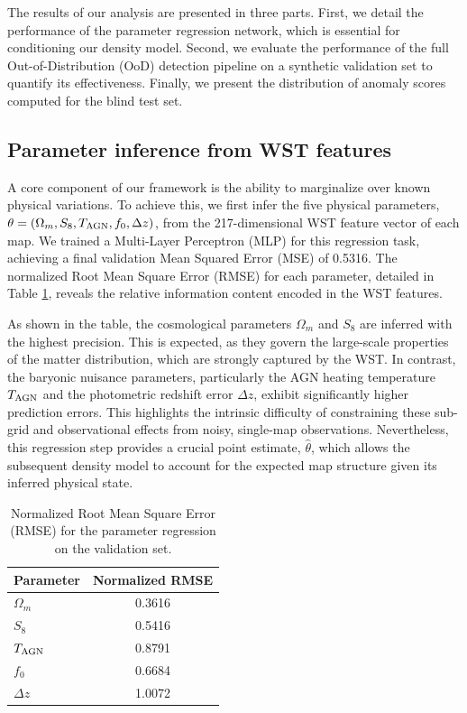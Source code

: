 \documentclass[]{article}
\begin{document}
The results of our analysis are presented in three parts. First, we detail the performance of the parameter regression network, which is essential for conditioning our density model. Second, we evaluate the performance of the full Out-of-Distribution (OoD) detection pipeline on a synthetic validation set to quantify its effectiveness. Finally, we present the distribution of anomaly scores computed for the blind test set.

\subsection{Parameter inference from WST features}
A core component of our framework is the ability to marginalize over known physical variations. To achieve this, we first infer the five physical parameters, $\theta = (\Omega_m, S_8, T_{\rm AGN}, f_0, \Delta z)$, from the 217-dimensional WST feature vector of each map. We trained a Multi-Layer Perceptron (MLP) for this regression task, achieving a final validation Mean Squared Error (MSE) of 0.5316. The normalized Root Mean Square Error (RMSE) for each parameter, detailed in Table \ref{tab:rmse}, reveals the relative information content encoded in the WST features.

As shown in the table, the cosmological parameters $\Omega_m$ and $S_8$ are inferred with the highest precision. This is expected, as they govern the large-scale properties of the matter distribution, which are strongly captured by the WST. In contrast, the baryonic nuisance parameters, particularly the AGN heating temperature $T_{\rm AGN}$ and the photometric redshift error $\Delta z$, exhibit significantly higher prediction errors. This highlights the intrinsic difficulty of constraining these sub-grid and observational effects from noisy, single-map observations. Nevertheless, this regression step provides a crucial point estimate, $\hat{\theta}$, which allows the subsequent density model to account for the expected map structure given its inferred physical state.

\begin{table}[h!]
\centering
\caption{Normalized Root Mean Square Error (RMSE) for the parameter regression on the validation set.}
\label{tab:rmse}
\begin{tabular}{lc}
\hline
\hline
Parameter & Normalized RMSE \\
\hline
$\Omega_m$ & 0.3616 \\
$S_8$ & 0.5416 \\
$T_{\rm AGN}$ & 0.8791 \\
$f_0$ & 0.6684 \\
$\Delta z$ & 1.0072 \\
\hline
\end{tabular}
\end{table}
\end{document}

